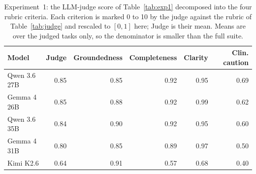\begin{table}[H]
\centering
\caption{Experiment~1: the LLM-judge score of Table~\ref{tab:exp1} decomposed into the four rubric criteria. Each criterion is marked 0 to 10 by the judge against the rubric of Table~\ref{tab:judge} and rescaled to $[0,1]$ here; Judge is their mean. Means are over the judged tasks only, so the denominator is smaller than the full suite.}
\label{tab:exp1_judge}
\small
\setlength{\tabcolsep}{5pt}
\begin{tabular}{@{}l rrrrr@{}}
\toprule
Model & Judge & Groundedness & Completeness & Clarity & Clin. caution \\
\midrule
Qwen 3.6 27B & 0.85 & 0.85 & 0.92 & 0.95 & 0.69 \\
Gemma 4 26B & 0.85 & 0.88 & 0.92 & 0.99 & 0.62 \\
Qwen 3.6 35B & 0.84 & 0.90 & 0.92 & 0.95 & 0.60 \\
Gemma 4 31B & 0.80 & 0.85 & 0.89 & 0.97 & 0.50 \\
Kimi K2.6 & 0.64 & 0.91 & 0.57 & 0.68 & 0.40 \\
\bottomrule
\end{tabular}
\end{table}
